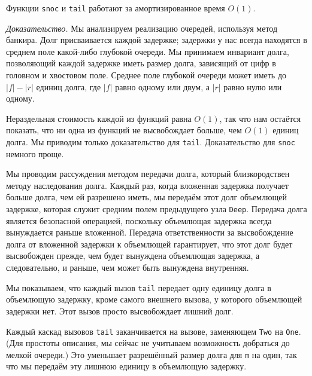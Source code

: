 \begin{theorem}\label{th:11.1}
  Функции \lstinline!snoc! и \lstinline!tail! работают за
  амортизированное время $O(1)$.

  \noindent
  \emph{Доказательство.} Мы анализируем реализацию очередей, используя
  метод банкира. Долг присваивается каждой задержке; задержки у нас
  всегда находятся в среднем поле какой-либо глубокой очереди.  Мы
  принимаем инвариант долга, позволяющий каждой задержке иметь размер
  долга, зависящий от цифр в головном и хвостовом поле. Среднее поле
  глубокой очереди может иметь до $|f| - |r|$ единиц долга, где $|f|$
  равно одному или двум, а $|r|$ равно нулю или одному.

  Нераздельная стоимость каждой из функций равна $O(1)$, так что нам
  остаётся показать, что ни одна из функций не высвобождает больше,
  чем $O(1)$ единиц долга. Мы приводим только доказательство для
  \lstinline!tail!. Доказательство для \lstinline!snoc! немного проще.

  Мы проводим рассуждения методом передачи долга, который
  близкородствен методу наследования долга.  Каждый раз, когда
  вложенная задержка получает больше долга, чем ей разрешено иметь, мы
  передаём этот долг объемлющей задержке, которая служит средним полем
  предыдущего узла \lstinline!Deep!. Передача долга является
  безопасной операцией, поскольку объемлющая задержка всегда
  вынуждается раньше вложенной.  Передача ответственности за
  высвобождение долга от вложенной задержки к объемлющей гарантирует,
  что этот долг будет высвобожден прежде, чем будет вынуждена
  объемлющая задержка, а следовательно, и раньше, чем может быть вынуждена
  внутренняя. 

  Мы показываем, что каждый вызов \lstinline!tail! передает одну
  единицу долга в объемлющую задержку, кроме самого внешнего вызова, у
  которого объемлющей задержки нет. Этот вызов просто высвобождает
  лишний долг.

  Каждый каскад вызовов \lstinline!tail! заканчивается на вызове,
  заменяющем \lstinline!Two! на 
  \lstinline!One!. (Для простоты описания, мы сейчас не учитываем
  возможность добраться до мелкой очереди.) Это уменьшает разрешённый
  размер долга для \lstinline!m! на один, так что мы передаём эту
  лишнюю единицу в объемлющую задержку.


\end{theorem}
